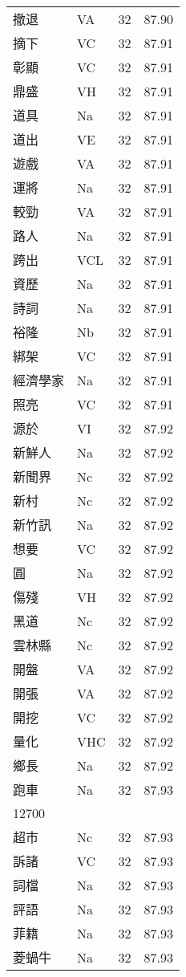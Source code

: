 \documentclass[twocolumn]{book}
\begin{document}
\begin{supertabular}{llrr}
撤退 & VA & 32 &  87.90\\
摘下 & VC & 32 &  87.91\\
彰顯 & VC & 32 &  87.91\\
鼎盛 & VH & 32 &  87.91\\
道具 & Na & 32 &  87.91\\
道出 & VE & 32 &  87.91\\
遊戲 & VA & 32 &  87.91\\
運將 & Na & 32 &  87.91\\
較勁 & VA & 32 &  87.91\\
路人 & Na & 32 &  87.91\\
跨出 & VCL & 32 &  87.91\\
資歷 & Na & 32 &  87.91\\
詩詞 & Na & 32 &  87.91\\
裕隆 & Nb & 32 &  87.91\\
綁架 & VC & 32 &  87.91\\
經濟學家 & Na & 32 &  87.91\\
照亮 & VC & 32 &  87.91\\
源於 & VI & 32 &  87.92\\
新鮮人 & Na & 32 &  87.92\\
新聞界 & Nc & 32 &  87.92\\
新村 & Nc & 32 &  87.92\\
新竹訊 & Na & 32 &  87.92\\
想要 & VC & 32 &  87.92\\
圓 & Na & 32 &  87.92\\
傷殘 & VH & 32 &  87.92\\
黑道 & Nc & 32 &  87.92\\
雲林縣 & Nc & 32 &  87.92\\
開盤 & VA & 32 &  87.92\\
開張 & VA & 32 &  87.92\\
開挖 & VC & 32 &  87.92\\
量化 & VHC & 32 &  87.92\\
鄉長 & Na & 32 &  87.92\\
跑車 & Na & 32 &  87.93\\
12700\\
超市 & Nc & 32 &  87.93\\
訴諸 & VC & 32 &  87.93\\
詞檔 & Na & 32 &  87.93\\
評語 & Na & 32 &  87.93\\
菲籍 & Na & 32 &  87.93\\
菱蝸牛 & Na & 32 &  87.93\\

\end{supertabular}
\end{document}
